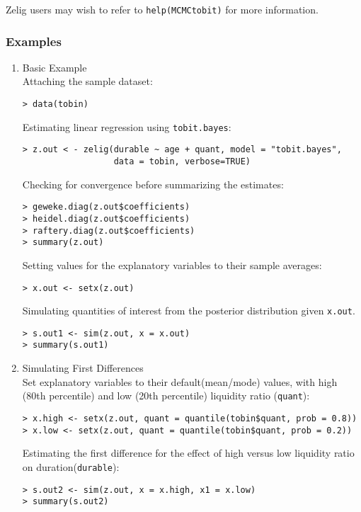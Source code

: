Zelig users may wish to refer to \texttt{help(MCMCtobit)} for more 
information.



\subsubsection{Examples}

\begin{enumerate}
\item {Basic Example} \\
Attaching the sample  dataset:
\begin{verbatim}
> data(tobin)
\end{verbatim}
Estimating linear regression using \texttt{tobit.bayes}:
\begin{verbatim}
> z.out < - zelig(durable ~ age + quant, model = "tobit.bayes",
                  data = tobin, verbose=TRUE)
\end{verbatim}
Checking for convergence before summarizing the estimates:
\begin{verbatim}
> geweke.diag(z.out$coefficients)
> heidel.diag(z.out$coefficients)
> raftery.diag(z.out$coefficients)
> summary(z.out)
\end{verbatim} %
Setting values for the explanatory variables to their sample averages:
\begin{verbatim}
> x.out <- setx(z.out)
\end{verbatim}
Simulating quantities of interest from the posterior distribution given 
\texttt{x.out}.
\begin{verbatim}
> s.out1 <- sim(z.out, x = x.out)
> summary(s.out1)
\end{verbatim}
\item {Simulating First Differences} \\
Set explanatory variables to their default(mean/mode) values, with high
(80th percentile) and low (20th percentile) liquidity ratio (\texttt{quant}):

\begin{verbatim}
> x.high <- setx(z.out, quant = quantile(tobin$quant, prob = 0.8))
> x.low <- setx(z.out, quant = quantile(tobin$quant, prob = 0.2))
\end{verbatim}
Estimating the first difference for the effect of
high versus low liquidity ratio on duration(\texttt{durable}):
\begin{verbatim}
> s.out2 <- sim(z.out, x = x.high, x1 = x.low)
> summary(s.out2)
\end{verbatim}
\end{enumerate}

